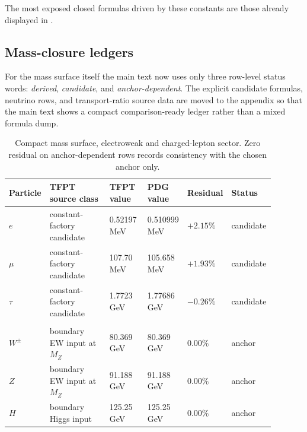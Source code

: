 The most exposed closed formulas driven by these constants are those already displayed in .

\subsection{Mass-closure ledgers}

For the mass surface itself the main text now uses only three row-level status words:
\emph{derived}, \emph{candidate}, and \emph{anchor-dependent}. The explicit candidate formulas, neutrino rows, and transport-ratio source data are moved to the appendix so that the main text shows a compact comparison-ready ledger rather than a mixed formula dump.

\begin{table}[p]
\centering
\scriptsize
\setlength{\tabcolsep}{3pt}
\begin{tabularx}{\linewidth}{@{}>{\raggedright\arraybackslash}p{0.10\linewidth}>{\raggedright\arraybackslash}p{0.27\linewidth}>{\raggedleft\arraybackslash}p{0.15\linewidth}>{\raggedleft\arraybackslash}p{0.15\linewidth}>{\raggedleft\arraybackslash}p{0.10\linewidth}>{\raggedright\arraybackslash}p{0.12\linewidth}@{}}
\toprule
Particle & TFPT source class & TFPT value & PDG value & Residual & Status \\
\midrule
$e$ & constant-factory candidate & \num{0.52197} MeV & \num{0.510999} MeV & $+2.15\%$ & candidate \\
$\mu$ & constant-factory candidate & \num{107.70} MeV & \num{105.658} MeV & $+1.93\%$ & candidate \\
$\tau$ & constant-factory candidate & \num{1.7723} GeV & \num{1.77686} GeV & $-0.26\%$ & candidate \\
\midrule
\multicolumn{6}{@{}l}{\textit{Calibration surface (anchor-dependent; zero residual = anchor consistency, not prediction):}} \\
$W^\pm$ & boundary EW input at $M_Z$ & \num{80.369} GeV & \num{80.369} GeV & $0.00\%$ & anchor \\
$Z$ & boundary EW input at $M_Z$ & \num{91.188} GeV & \num{91.188} GeV & $0.00\%$ & anchor \\
$H$ & boundary Higgs input & \num{125.25} GeV & \num{125.25} GeV & $0.00\%$ & anchor \\
\bottomrule
\end{tabularx}
\caption{Compact mass surface, electroweak and charged-lepton sector. Zero residual on anchor-dependent rows records consistency with the chosen anchor only.}
\label{tab:sm-mass-ledger-ew}
\end{table}


